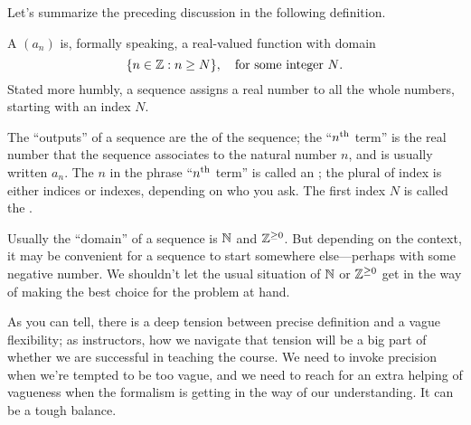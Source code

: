 Let's summarize the preceding discussion in the following definition.
\begin{definition} \relax{} A 
  $(a_n)$ is, formally speaking, a real-valued function with domain
  \[
  \{ n \in \mathbb{Z} : n \geq N \},\quad \mbox{for some integer $N$.}
  \]
  Stated more humbly, a sequence assigns a real number to all the whole
  numbers, starting with an index $N$.  

  The ``outputs'' of a sequence are the  of the
  sequence; the ``$n^{\mbox{\scriptsize th}}$ term'' is the real number that the
  sequence associates to the natural number $n$, and is usually
  written $a_n$.  The $n$ in the phrase
  ``$n^{\mbox{\scriptsize th}}$ term'' is called an
  ; the plural of index is
  either indices or indexes, depending on who you ask.  The first
  index $N$ is called the .
\end{definition} 



\begin{warning}
  Usually the ``domain'' of a sequence is $\mathbb{N}$ and $\mathbb{Z}^{\ge 0}$.  But
  depending on the context, it may be convenient for a sequence to
  start somewhere else---perhaps with some negative number.  We
  shouldn't let the usual situation of $\mathbb{N}$ or $\mathbb{Z}^{\ge 0}$ get in the
  way of making the best choice for the problem at hand.
\end{warning}

As you can tell, there is a deep tension between precise definition
and a vague flexibility; as instructors, how we navigate that tension
will be a big part of whether we are successful in teaching the
course.  We need to invoke precision when we're tempted to be too
vague, and we need to reach for an extra helping of vagueness when the
formalism is getting in the way of our understanding.  It can be a
tough balance.

